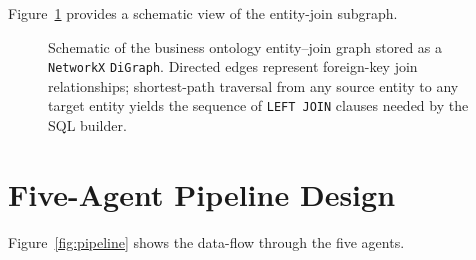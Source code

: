 \documentclass[12pt,a4paper]{report}
\begin{document}
Figure~\ref{fig:ontology-graph} provides a schematic view of the entity-join subgraph.

\begin{figure}[H]
  \centering
  \caption{Schematic of the business ontology entity--join graph stored as a \texttt{NetworkX} \texttt{DiGraph}. Directed edges represent foreign-key join relationships; shortest-path traversal from any source entity to any target entity yields the sequence of \texttt{LEFT JOIN} clauses needed by the SQL builder.}
  \label{fig:ontology-graph}
\end{figure}

\section{Five-Agent Pipeline Design}
\label{sec:pipeline-design}

Figure~\ref{fig:pipeline} shows the data-flow through the five agents.
\end{document}
